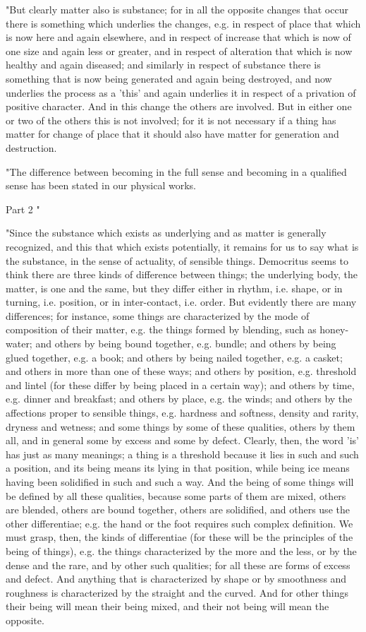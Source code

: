 "But clearly matter also is substance; for in all the opposite changes
that occur there is something which underlies the changes, e.g. in
respect of place that which is now here and again elsewhere, and in
respect of increase that which is now of one size and again less or
greater, and in respect of alteration that which is now healthy and
again diseased; and similarly in respect of substance there is something
that is now being generated and again being destroyed, and now underlies
the process as a 'this' and again underlies it in respect of a privation
of positive character. And in this change the others are involved.
But in either one or two of the others this is not involved; for it
is not necessary if a thing has matter for change of place that it
should also have matter for generation and destruction. 

"The difference between becoming in the full sense and becoming in
a qualified sense has been stated in our physical works.

Part 2 "

"Since the substance which exists as underlying and as matter is generally
recognized, and this that which exists potentially, it remains for
us to say what is the substance, in the sense of actuality, of sensible
things. Democritus seems to think there are three kinds of difference
between things; the underlying body, the matter, is one and the same,
but they differ either in rhythm, i.e. shape, or in turning, i.e.
position, or in inter-contact, i.e. order. But evidently there are
many differences; for instance, some things are characterized by the
mode of composition of their matter, e.g. the things formed by blending,
such as honey-water; and others by being bound together, e.g. bundle;
and others by being glued together, e.g. a book; and others by being
nailed together, e.g. a casket; and others in more than one of these
ways; and others by position, e.g. threshold and lintel (for these
differ by being placed in a certain way); and others by time, e.g.
dinner and breakfast; and others by place, e.g. the winds; and others
by the affections proper to sensible things, e.g. hardness and softness,
density and rarity, dryness and wetness; and some things by some of
these qualities, others by them all, and in general some by excess
and some by defect. Clearly, then, the word 'is' has just as many
meanings; a thing is a threshold because it lies in such and such
a position, and its being means its lying in that position, while
being ice means having been solidified in such and such a way. And
the being of some things will be defined by all these qualities, because
some parts of them are mixed, others are blended, others are bound
together, others are solidified, and others use the other differentiae;
e.g. the hand or the foot requires such complex definition. We must
grasp, then, the kinds of differentiae (for these will be the principles
of the being of things), e.g. the things characterized by the more
and the less, or by the dense and the rare, and by other such qualities;
for all these are forms of excess and defect. And anything that is
characterized by shape or by smoothness and roughness is characterized
by the straight and the curved. And for other things their being will
mean their being mixed, and their not being will mean the opposite.

